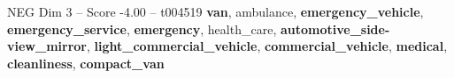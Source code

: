 \begin{textsample}{NEG Dim 3 – Score -4.00 – t004519}  \label{ex:f3_neg_032}
\textbf{van}, ambulance, \textbf{emergency\_vehicle}, \textbf{emergency\_service}, \textbf{emergency}, health\_care, \textbf{automotive\_side-view\_mirror}, \textbf{light\_commercial\_vehicle}, \textbf{commercial\_vehicle}, \textbf{medical}, \textbf{cleanliness}, \textbf{compact\_van}

\end{textsample}

